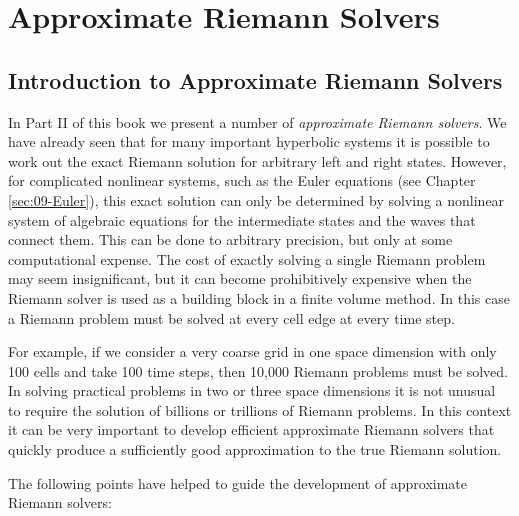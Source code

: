 \documentclass{SIAMbook2016}
\begin{document}
\part{Approximate Riemann Solvers}

\hypertarget{introduction-to-approximate-riemann-solvers}{%
\chapter{Introduction to Approximate Riemann
Solvers}\label{introduction-to-approximate-riemann-solvers}}
\label{sec:10-Approximate_solvers}
In Part II of this book we present a number of \emph{approximate Riemann
solvers}. We have already seen that for many important hyperbolic
systems it is possible to work out the exact Riemann solution for
arbitrary left and right states. However, for complicated nonlinear
systems, such as the Euler equations (see Chapter \ref{sec:09-Euler}),
this exact solution can only be determined by solving a nonlinear system
of algebraic equations for the intermediate states and the waves that
connect them. This can be done to arbitrary precision, but only at some
computational expense. The cost of exactly solving a single Riemann
problem may seem insignificant, but it can become prohibitively
expensive when the Riemann solver is used as a building block in a
finite volume method. In this case a Riemann problem must be solved at
every cell edge at every time step.

For example, if we consider a very coarse grid in one space dimension
with only 100 cells and take 100 time steps, then 10,000 Riemann
problems must be solved. In solving practical problems in two or three
space dimensions it is not unusual to require the solution of billions
or trillions of Riemann problems. In this context it can be very
important to develop efficient approximate Riemann solvers that quickly
produce a sufficiently good approximation to the true Riemann solution.

The following points have helped to guide the development of approximate
Riemann solvers:
\end{document}
